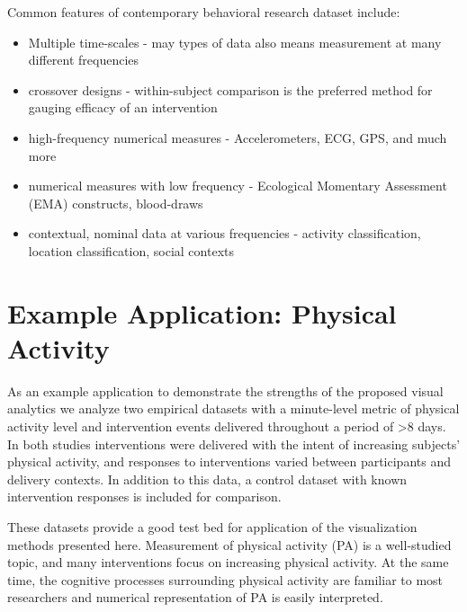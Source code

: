 \documentclass[review,journal]{vgtc}         %
\newcommand{\comment}[1]{}  %
\begin{document}
Common features of contemporary behavioral research dataset include:

\begin{itemize}
	\item{Multiple time-scales - may types of data also means measurement at many different frequencies}
	\item{crossover designs - within-subject comparison is the preferred method for gauging efficacy of an intervention}
	\item{high-frequency numerical measures - Accelerometers, ECG, GPS, and much more}
	\item{numerical measures with low frequency - Ecological Momentary Assessment (EMA) constructs, blood-draws}
	\item{contextual, nominal data at various frequencies - activity classification, location classification, social contexts}
\end{itemize}


\comment{
I think this is well covered elsewhere (intro especially)
\subsection{Weaknesses in Current Methodology}

TODO: What do they need to know about intervention dynamics?
}

\section{Example Application: Physical Activity}
As an example application to demonstrate the strengths of the proposed visual analytics we analyze two empirical datasets with a minute-level metric of physical activity level and intervention events delivered throughout a period of >8 days.
In both studies interventions were delivered with the intent of increasing subjects’ physical activity, and responses to interventions varied between participants and delivery contexts.
In addition to this data, a control dataset with known intervention responses is included for comparison.

These datasets provide a good test bed for application of the visualization methods presented here.
Measurement of physical activity (PA) is a well-studied topic, and many interventions focus on increasing physical activity.
At the same time, the cognitive processes surrounding physical activity are familiar to most researchers and numerical representation of PA is easily interpreted.
\end{document}
